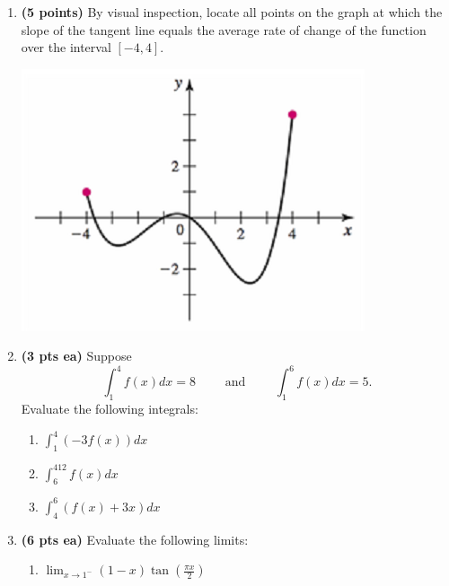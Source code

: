 \documentclass[12pt,letterpaper]{article}
\begin{document}
\newpage

\begin{enumerate}[1.]

\item {\bf (5 points)} By visual inspection, locate all points on the graph at which the slope of the tangent line equals the average rate of change of the function over the interval $[-4,4]$.

\vspace{1pc}
\begin{center}
\includegraphics[scale=1.25]{Exam4pic}

\vspace{0.5pc}{\footnotesize from Briggs, et al.}
\end{center}

\newpage
\item {\bf (3 pts ea)} Suppose
\[\int_1^4f(x)dx=8 \qquad\text{ and }\qquad \int_1^6f(x)dx=5.\]
Evaluate the following integrals:
	
	\begin{enumerate}
	\item $\displaystyle\int_1^4\left(-3f(x)\right)dx$
	
	\vspace{12pc}
	\item $\displaystyle\int_6^412f(x)dx$
	
	\vspace{14pc}
	\item $\displaystyle\int_4^6\left(f(x)+3x\right)dx$
	\end{enumerate}

\newpage
\item {\bf (6 pts ea)} Evaluate the following limits:
	
	\begin{enumerate}
	\item $\displaystyle\lim_{x\to 1^-}(1-x)\tan{\left(\frac{\pi x}{2}\right)}$
	

\end{enumerate}
\end{enumerate}
\end{document}
